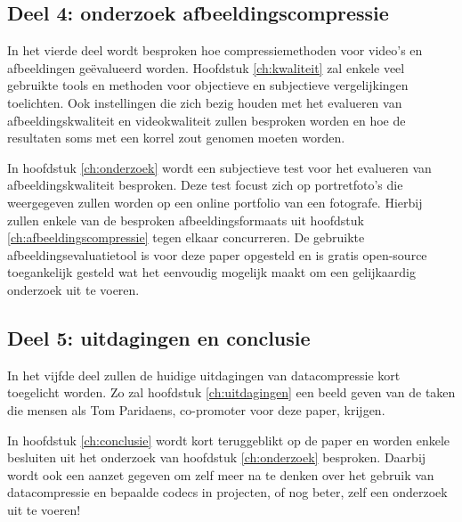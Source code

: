 \subsection{Deel 4: onderzoek afbeeldingscompressie}
\label{sec:opzet-bachelorproef-deel-4}

In het vierde deel wordt besproken hoe compressiemethoden voor video's en afbeeldingen geëvalueerd worden. Hoofdstuk \ref{ch:kwaliteit} zal enkele veel gebruikte tools en methoden voor objectieve en subjectieve vergelijkingen toelichten. Ook instellingen die zich bezig houden met het evalueren van afbeeldingskwaliteit en videokwaliteit zullen besproken worden en hoe de resultaten soms met een korrel zout genomen moeten worden.

In hoofdstuk \ref{ch:onderzoek} wordt een subjectieve test voor het evalueren van afbeeldingskwaliteit besproken. Deze test focust zich op portretfoto's die weergegeven zullen worden op een online portfolio van een fotografe. Hierbij zullen enkele van de besproken \glspl{afbeeldingsformaat} uit hoofdstuk \ref{ch:afbeeldingscompressie} tegen elkaar concurreren. De gebruikte \gls{afbeeldingsevaluatietool} is voor deze paper opgesteld en is gratis \gls{open-source} toegankelijk gesteld wat het eenvoudig mogelijk maakt om een gelijkaardig onderzoek uit te voeren.

\subsection{Deel 5: uitdagingen en conclusie}
\label{sec:opzet-bachelorproef-deel-5}

In het vijfde deel zullen de huidige uitdagingen van \gls{datacompressie} kort toegelicht worden. Zo zal hoofdstuk \ref{ch:uitdagingen} een beeld geven van de taken die mensen als Tom Paridaens, co-promoter voor deze paper, krijgen.

In hoofdstuk \ref{ch:conclusie} wordt kort teruggeblikt op de paper en worden enkele besluiten uit het onderzoek van hoofdstuk \ref{ch:onderzoek} besproken. Daarbij wordt ook een aanzet gegeven om zelf meer na te denken over het gebruik van \gls{datacompressie} en bepaalde  \glspl{codec} in projecten, of nog beter, zelf een onderzoek uit te voeren!
